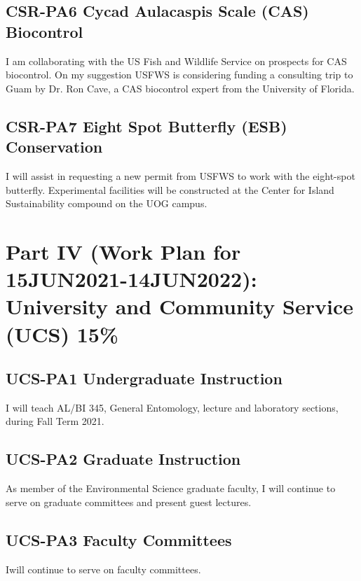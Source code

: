 \subsection{CSR-PA6 Cycad Aulacaspis Scale (CAS) Biocontrol}

I am collaborating with the US Fish and Wildlife Service on prospects for CAS biocontrol. On my suggestion USFWS is considering funding a consulting trip to Guam by Dr. Ron Cave, a CAS biocontrol expert from the University of Florida.  

\subsection{CSR-PA7 Eight Spot Butterfly (ESB) Conservation}

I will assist in requesting a new permit from USFWS to work with the eight-spot butterfly. Experimental facilities will be constructed at the Center for Island Sustainability compound on the UOG campus.

\newpage
\section{Part IV (Work Plan for 15JUN2021-14JUN2022): University and Community Service (UCS) 15\%}

\subsection{UCS-PA1 Undergraduate Instruction}

I will teach AL/BI 345, General Entomology, lecture and laboratory sections, during Fall Term 2021.

\subsection{UCS-PA2 Graduate Instruction}As member of the Environmental Science graduate faculty, I will continue to serve on graduate committees and present guest lectures.

\subsection{UCS-PA3 Faculty Committees}Iwill continue to serve on faculty committees. 


